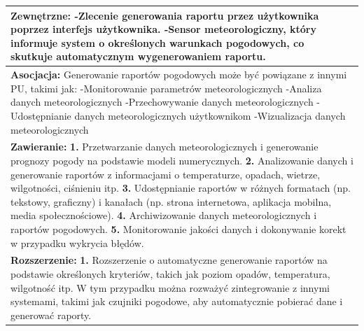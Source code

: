 \documentclass{article}
\begin{document}
\begin{center}
\begin{center}
\begin{tabular}{|l|l|l|}
{        \textbf{Zewnętrzne:}
        \newline
        -Zlecenie generowania raportu przez użytkownika poprzez interfejs użytkownika.
        \newline
        -Sensor meteorologiczny, który informuje system o określonych warunkach pogodowych, co skutkuje automatycznym wygenerowaniem raportu.} \\
        \hline
        \hline
        \multicolumn{3}{|p{\dimexpr\linewidth-2\tabcolsep-2\arrayrulewidth}|}{\textbf{Asocjacja:}
        \newline
        Generowanie raportów pogodowych może być powiązane z innymi PU, takimi jak:
        \newline
        -Monitorowanie parametrów meteorologicznych
        \newline
        -Analiza danych meteorologicznych
        \newline
        -Przechowywanie danych meteorologicznych
        \newline
        -Udostępnianie danych meteorologicznych użytkownikom
        \newline
        -Wizualizacja danych meteorologicznych} \\
        \hline
        \hline
        \multicolumn{3}{|p{\dimexpr\linewidth-2\tabcolsep-2\arrayrulewidth}|}{\textbf{Zawieranie:}
        \newline
        \textbf{1.} Przetwarzanie danych meteorologicznych i generowanie prognozy pogody na podstawie modeli numerycznych.
        \newline
        \textbf{2.} Analizowanie danych i generowanie raportów z informacjami o temperaturze, opadach, wietrze, wilgotności, ciśnieniu itp.
        \newline
        \textbf{3.} Udostępnianie raportów w różnych formatach (np. tekstowy, graficzny) i kanałach (np. strona internetowa, aplikacja mobilna, media społecznościowe).
        \newline
        \textbf{4.} Archiwizowanie danych meteorologicznych i raportów pogodowych.
        \newline
        \textbf{5.} Monitorowanie jakości danych i dokonywanie korekt w przypadku wykrycia błędów.} \\
        \hline
        \hline
        \multicolumn{3}{|p{\dimexpr\linewidth-2\tabcolsep-2\arrayrulewidth}|}{\textbf{Rozszerzenie:}
        \newline
        \textbf{1.} Rozszerzenie o automatyczne generowanie raportów na podstawie określonych kryteriów, takich jak poziom opadów, temperatura, wilgotność itp. W tym przypadku można rozważyć zintegrowanie z innymi systemami, takimi jak czujniki pogodowe, aby automatycznie pobierać dane i generować raporty.
}
\end{tabular}
\end{center}
\end{center}
\end{document}
